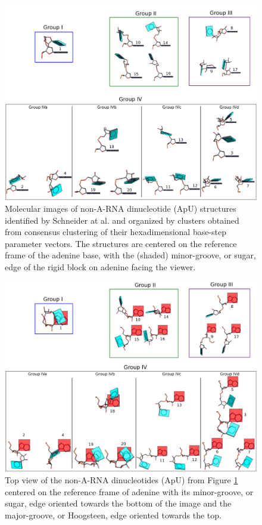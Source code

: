 \begin{figure}[htbp]
 \centering
\includegraphics[angle=90, scale=0.43]{Chapter2/collageb.png}
 \caption{Molecular images of  non-A-RNA dinucleotide (ApU) structures
   identified by Schneider  at al.  \cite{schneider2004} and organized
   by   clusters   obtained  from   consensus   clustering  of   their
   hexadimensional  base-step parameter  vectors.  The  structures are
   centered  on the  reference frame  of  the adenine  base, with  the
   (shaded) minor-groove, or sugar, edge of the rigid block on adenine
   facing the viewer.}
 \label{fig:nonAclus}
\end{figure}

\begin{figure}
\centering
\includegraphics[angle=90, scale=0.48]{Chapter2/collage2.png}
\caption{Top  view of  the non-A-RNA  dinucleotides (ApU)  from Figure
  \ref{fig:nonAclus} centered  on the reference frame  of adenine with
  its minor-groove, or sugar, \cite{leontis1998} edge oriented towards
  the  bottom  of  the  image  and  the  major-groove,  or  Hoogsteen,
  \cite{leontis1998} edge oriented towards the top.}
\label{fig:steps2}
\end{figure}

